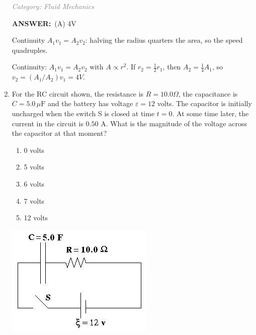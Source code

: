 ﻿\documentclass[12pt, a4paper]{article}
\makeatletter
\newcommand{\finalanswer}[1]{\textbf{ANSWER:}~#1}
\newif\if@categoryprinted
\newcommand{\category}[1]{\if@categoryprinted\relax\else\textit{\textcolor{gray}{Category: #1}}\global\@categoryprintedtrue\fi}
\newcommand{\tags}[1]{}
\makeatother
\begin{document}
\begin{CJK*}{UTF8}{gbsn}
\begin{enumerate}[itemsep=1.0em, topsep=0.6em]
\category{Fluid Mechanics} \tags{}
\begin{answerbox}
\finalanswer{(A) 4V}
\end{answerbox}
\begin{insightbox}
Continuity $A_1v_1=A_2v_2$: halving the radius quarters the area, so the speed quadruples.
\end{insightbox}
\begin{solutionbox}

Continuity: $A_1 v_1 = A_2 v_2$ with $A\propto r^2$. If $r_2=\tfrac{1}{2}r_1$, then $A_2=\tfrac{1}{4}A_1$, so $v_2 = (A_1/A_2) v_1 = 4V$.
\end{solutionbox}

\item \label{prob:12}
\noindent\begin{minipage}[t]{0.6\linewidth}
\vspace{0pt}
For the RC circuit shown, the resistance is $R = 10.0 \Omega$, the capacitance is $C = 5.0\,\mu\mathrm{F}$ and the battery has voltage $\varepsilon = 12$ volts. The capacitor is initially uncharged when the switch S is closed at time $t = 0$. At some time later, the current in the circuit is $0.50$ A. What is the magnitude of the voltage across the capacitor at that moment?
\begin{enumerate}[label=(\Alph*)]
    \item 0 volts
    \item 5 volts
    \item 6 volts
    \item 7 volts
    \item 12 volts
\end{enumerate}
\end{minipage}%
\hfill
\begin{minipage}[t]{0.35\linewidth}
\vspace{0pt}
\centering
\includegraphics[width=\linewidth]{Problem_12_Figure.png}
\end{minipage}


\end{enumerate}
\end{CJK*}
\end{document}
